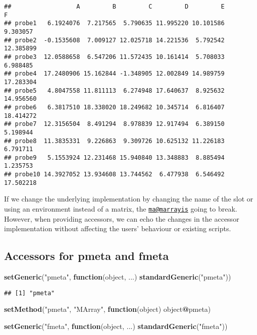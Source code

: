 \documentclass[]{article}
\newenvironment{Shaded}{\begin{snugshade}}{\end{snugshade}}
\newcommand{\ControlFlowTok}[1]{\textcolor[rgb]{0.13,0.29,0.53}{\textbf{#1}}}
\newcommand{\KeywordTok}[1]{\textcolor[rgb]{0.13,0.29,0.53}{\textbf{#1}}}
\newcommand{\NormalTok}[1]{#1}
\newcommand{\OperatorTok}[1]{\textcolor[rgb]{0.81,0.36,0.00}{\textbf{#1}}}
\newcommand{\StringTok}[1]{\textcolor[rgb]{0.31,0.60,0.02}{#1}}
\begin{document}
\begin{verbatim}
##                  A         B         C         D         E         F
## probe1   6.1924076  7.217565  5.790635 11.995220 10.101586  9.303057
## probe2  -0.1535608  7.009127 12.025718 14.221536  5.792542 12.385899
## probe3  12.0588658  6.547206 11.572435 10.161414  5.708033  6.988485
## probe4  17.2480906 15.162844 -1.348905 12.002849 14.989759 17.283304
## probe5   4.8047558 11.811113  6.274948 17.640637  8.925632 14.956560
## probe6   6.3817510 18.338020 18.249682 10.345714  6.816407 18.414272
## probe7  12.3156504  8.491294  8.978839 12.917494  6.389150  5.198944
## probe8  11.3835331  9.226863  9.309726 10.625132 11.226183  6.791711
## probe9   5.1553924 12.231468 15.940840 13.348883  8.885494  1.235753
## probe10 14.3927052 13.934608 13.744562  6.477938  6.546492 17.502218
\end{verbatim}

If we change the underlying implementation by changing the name of the
slot or using an environment instead of a matrix, the
\href{mailto:ma@marrayis}{\nolinkurl{ma@marrayis}} going to break.
However, when providing accessors, we can echo the changes in the
accessor implementation without aﬀecting the users' behaviour or
existing scripts.

\hypertarget{accessors-for-pmeta-and-fmeta}{%
\subsection{Accessors for pmeta and
fmeta}\label{accessors-for-pmeta-and-fmeta}}

\begin{Shaded}
\begin{Highlighting}[]
\KeywordTok{setGeneric}\NormalTok{(}\StringTok{"pmeta"}\NormalTok{, }\ControlFlowTok{function}\NormalTok{(object, ...) }\KeywordTok{standardGeneric}\NormalTok{(}\StringTok{"pmeta"}\NormalTok{))}
\end{Highlighting}
\end{Shaded}

\begin{verbatim}
## [1] "pmeta"
\end{verbatim}

\begin{Shaded}
\begin{Highlighting}[]
\KeywordTok{setMethod}\NormalTok{(}\StringTok{"pmeta"}\NormalTok{, }\StringTok{"MArray"}\NormalTok{, }\ControlFlowTok{function}\NormalTok{(object) object}\OperatorTok{@}\NormalTok{pmeta)}

\KeywordTok{setGeneric}\NormalTok{(}\StringTok{"fmeta"}\NormalTok{, }\ControlFlowTok{function}\NormalTok{(object, ...) }\KeywordTok{standardGeneric}\NormalTok{(}\StringTok{"fmeta"}\NormalTok{))}
\end{Highlighting}
\end{Shaded}
\end{document}
